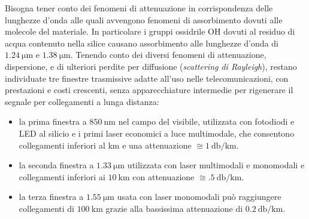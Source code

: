 Bisogna tener conto dei fenomeni di attenuazione in corrispondenza delle lunghezze d'onda alle quali avvengono fenomeni di assorbimento dovuti alle molecole del materiale. In particolare i gruppi ossidrile OH dovuti al residuo di acqua contenuto nella silice causano assorbimento alle lunghezze d'onda di $\SI{1.24}{\micro\meter}$ e $\SI{1.38}{\micro\meter}$.
Tenendo conto dei diversi fenomeni di attenuazione, dispersione, e di ulteriori perdite per diffusione (\emph{scattering di Rayleigh}), restano individuate tre finestre trasmissive adatte all'uso nelle telecomunicazioni, con prestazioni e costi crescenti, senza apparecchiature intermedie per rigenerare il segnale per collegamenti a lunga distanza:
\begin{itemize}
\item la prima finestra a $\SI{850}{\nano\meter}$ nel campo del visibile, utilizzata con fotodiodi e LED al silicio e i primi laser economici a luce multimodale, che consentono collegamenti inferiori al km e una attenuazione $\cong\SI{1}{\decibel\per\kilo\meter}$.
\item la seconda finestra a $\SI{1.33}{\micro\meter}$ utilizzata con laser multimodali e monomodali e collegamenti inferiori ai $\SI{10}{\kilo\meter}$ con attenuazione $\cong\SI{.5}{\decibel\per\kilo\meter}$.
\item la terza finestra a $\SI{1.55}{\micro\meter}$ usata con laser monomodali può raggiungere collegamenti di $\SI{100}{\kilo\meter}$ grazie alla bassissima attenuazione di $\SI{0.2}{\decibel\per\kilo\meter}$.
\end{itemize}

\begin{figure}[!ht]\centering
{}
\end{figure}

